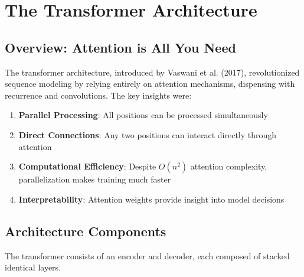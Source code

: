 
\section{The Transformer Architecture}

\subsection{Overview: Attention is All You Need}

The transformer architecture, introduced by Vaswani et al. (2017), revolutionized sequence modeling by relying entirely on attention mechanisms, dispensing with recurrence and convolutions. The key insights were:

\begin{enumerate}
    \item \textbf{Parallel Processing}: All positions can be processed simultaneously
    \item \textbf{Direct Connections}: Any two positions can interact directly through attention
    \item \textbf{Computational Efficiency}: Despite $O(n^2)$ attention complexity, parallelization makes training much faster
    \item \textbf{Interpretability}: Attention weights provide insight into model decisions
\end{enumerate}

\subsection{Architecture Components}

The transformer consists of an encoder and decoder, each composed of stacked identical layers.

